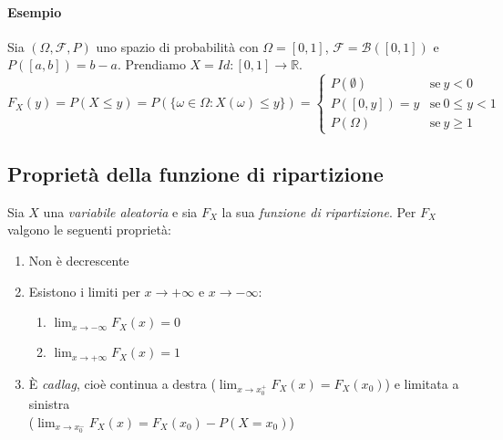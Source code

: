 \documentclass[12pt, a4paper]{report}
\theoremstyle{definition}
\DeclareRobustCommand{\F}{\mathcal{F}}%
\DeclareRobustCommand{\R}{\mathbb{R}}%
\DeclareRobustCommand{\B}{\mathcal{B}}%
\DeclareRobustCommand{\probspace}{(\Omega,\F,P)}
\begin{document}
\paragraph*{Esempio}
Sia $\probspace$ uno spazio di probabilità con \(\Omega=[0,1]\), \(\F=\B([0,1])\)
e \(P([a,b]) = b-a\). Prendiamo \(X=Id:[0,1]\rightarrow\R\).
\[F_X(y)=P(X\leq y)=P(\{\omega\in\Omega:X(\omega)\leq y\})=\begin{cases}
	{P(\emptyset)} & \text{se}\ {y < 0}\\
	{P([0,y])=y} & \text{se}\ {0\leq y<1}\\
	{P(\Omega)} & \text{se}\ {y\geq 1}
\end{cases}\]
\begin{center}
\end{center}

\newpage
\subsection{Proprietà della funzione di ripartizione}
Sia $X$ una \emph{variabile aleatoria} e sia $F_X$ la sua \emph{funzione di
ripartizione}. Per $F_X$ valgono le seguenti proprietà:
\begin{enumerate}[label=(\roman*)]
	\item Non è decrescente
	\item Esistono i limiti per \(x\rightarrow +\infty\) e \(x\rightarrow -\infty\):
		\begin{enumerate}
			\item \(\lim_{x\rightarrow -\infty}F_X(x) = 0\)
			\item \(\lim_{x\rightarrow +\infty}F_X(x) = 1\)
		\end{enumerate}
	\item È \emph{cadlag}, cioè continua a destra (\(\lim_{x\rightarrow x_0^+}
	F_X(x)=F_X(x_0)\)) e limitata a sinistra\\ (\(\lim_{x\rightarrow x_0^-} F_X(x)
	=F_X(x_0) - P(X = x_0)\))
\end{enumerate}
\end{document}
